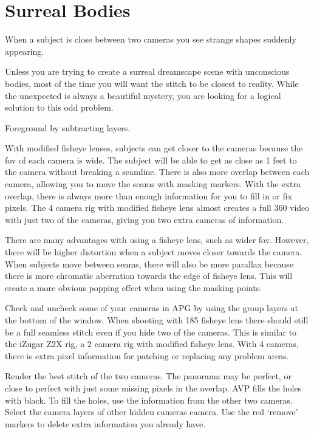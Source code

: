 \chapter{Surreal Bodies}
\pagecolor{white}
\label{chap:39}
\begin{fullwidth}


\problem

{\large When a subject is close between two cameras you see strange shapes suddenly appearing. \par}

Unless you are trying to create a surreal dreamscape scene with unconscious bodies, most of the time you will want the stitch to be closest to reality. While the unexpected is always a beautiful mystery, you are looking for a logical solution to this odd problem.  

\clearpage
\solutions

{\large Foreground by subtracting layers. \par}

With modified fisheye lenses, subjects can get closer to the cameras because the fov of each camera is wide. The subject will be able to get as close as 1 feet to the camera without breaking a seamline. There is also more overlap between each camera, allowing you to move the seams with masking markers. With the extra overlap, there is always more than enough information for you to fill in or fix pixels. The 4 camera rig with modified fisheye lens almost creates a full 360 video with just two of the cameras, giving you two extra cameras of information.


There are many advantages with using a fisheye lens, such as wider fov. However, there will be higher distortion when a subject moves closer towards the camera. When subjects move between seams, there will also be more parallax because there is more chromatic aberration towards the edge of fisheye lens. This will create a more obvious popping effect when using the masking points.

Check and uncheck some of your cameras in APG by using the group layers at the bottom of the window. When shooting with 185 fisheye lens there should still be a full seamless stitch even if you hide two of the cameras.  This is similar to the iZugar Z2X rig, a 2 camera rig with modified fisheye lens. With 4 cameras, there is extra pixel information for patching or replacing any problem areas. 


Render the best stitch of the two cameras. The panorama may be perfect, or close to perfect with just some missing pixels in the overlap. AVP fills the holes with black. To fill the holes, use the information from the other two cameras. Select the camera layers of other  hidden cameras camera. Use the red ‘remove’ markers to delete extra information you already have.


\clearpage
\end{fullwidth}